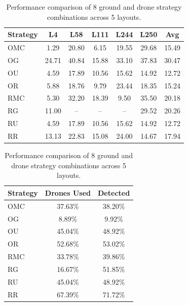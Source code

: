 \begin{small}
\begin{table}[htbp]
\centering
\small
\setlength{\tabcolsep}{4pt}
\begin{tabular}{lcccccc}
\hline
\textbf{Strategy} & \textbf{L4} & \textbf{L58} & \textbf{L111} & \textbf{L244} & \textbf{L250} & \textbf{Avg} \\
\hline
OMC & 1.29 & 20.80 & 6.15 & 19.55 & 29.68 & 15.49 \\
OG  & 24.71 & 40.84 & 15.88 & 33.10 & 37.83 & 30.47 \\
OU  & 4.59 & 17.89 & 10.56 & 15.62 & 14.92 & 12.72 \\
OR  & 5.88 & 18.76 & 9.79 & 23.44 & 18.35 & 15.24 \\
RMC & 5.30 & 32.20 & 18.39 & 9.50 & 35.50 & 20.18 \\
RG  & 11.00 & -- & -- & -- & 29.52 & 20.26 \\
RU  & 4.59 & 17.89 & 10.56 & 15.62 & 14.92 & 12.72 \\
RR  & 13.13 & 22.83 & 15.08 & 24.00 & 14.67 & 17.94 \\
\hline
\end{tabular}
\vspace{0.5em}

\begin{tabular}{lcc}
\textbf{Strategy} & \textbf{Drones Used} & \textbf{Detected} \\
\hline
OMC & 37.63\% & 38.20\% \\
OG  & 8.89\% & 9.92\% \\
OU  & 45.04\% & 48.92\% \\
OR  & 52.68\% & 53.02\% \\
RMC & 33.78\% & 39.86\% \\
RG  & 16.67\% & 51.85\% \\
RU  & 45.04\% & 48.92\% \\
RR  & 67.39\% & 71.72\% \\
\hline
\end{tabular}
\caption{Performance comparison of 8 ground and drone strategy combinations across 5 layouts.}
\end{table}

\end{small}
\fi